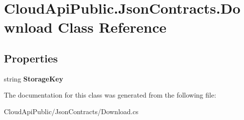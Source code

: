 \hypertarget{class_cloud_api_public_1_1_json_contracts_1_1_download}{\section{Cloud\-Api\-Public.\-Json\-Contracts.\-Download Class Reference}
\label{class_cloud_api_public_1_1_json_contracts_1_1_download}
}
\subsection*{Properties}
\begin{DoxyCompactItemize}
\item 
\hypertarget{class_cloud_api_public_1_1_json_contracts_1_1_download_a9ed3b9a016d03e414297d11598971e51}{string {\bfseries Storage\-Key}}\label{class_cloud_api_public_1_1_json_contracts_1_1_download_a9ed3b9a016d03e414297d11598971e51}

\end{DoxyCompactItemize}


The documentation for this class was generated from the following file\-:\begin{DoxyCompactItemize}
\item 
Cloud\-Api\-Public/\-Json\-Contracts/Download.\-cs\end{DoxyCompactItemize}
